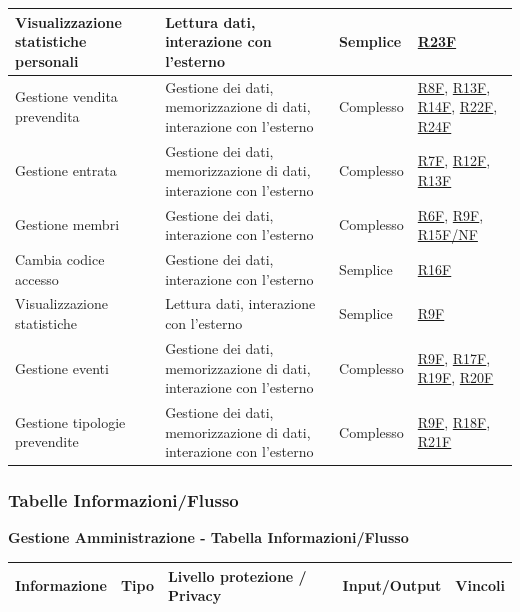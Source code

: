\documentclass[a4paper]{article}
\begin{document}
\begin{center}
\begin{tabularx}{1\textwidth}{|X|X|X|X|}
        \hline
        Visualizzazione statistiche personali & Lettura dati, interazione con l'esterno & Semplice &  \hyperlink{R23F}{R23F} \\
        \hline
        Gestione vendita prevendita & Gestione dei dati, memorizzazione di dati, interazione con l'esterno & Complesso & \hyperlink{R8F}{R8F}, \hyperlink{R13F}{R13F}, \hyperlink{R14F}{R14F}, \hyperlink{R22F}{R22F}, \hyperlink{R24F}{R24F} \\
        \hline
        Gestione entrata & Gestione dei dati, memorizzazione di dati, interazione con l'esterno & Complesso & \hyperlink{R7F}{R7F}, \hyperlink{R12F}{R12F}, \hyperlink{R13F}{R13F} \\
        \hline
        Gestione membri & Gestione dei dati, interazione con l'esterno & Complesso & \hyperlink{R6F}{R6F}, \hyperlink{R9F}{R9F}, \hyperlink{R15F/NF}{R15F/NF} \\
        \hline
        Cambia codice accesso & Gestione dei dati, interazione con l'esterno & Semplice & \hyperlink{R16F}{R16F}  \\
        \hline
        Visualizzazione statistiche & Lettura dati, interazione con l'esterno & Semplice & \hyperlink{R9F}{R9F}  \\
        \hline
        Gestione eventi & Gestione dei dati, memorizzazione di dati, interazione con l'esterno & Complesso & \hyperlink{R9F}{R9F}, \hyperlink{R17F}{R17F}, \hyperlink{R19F}{R19F}, \hyperlink{R20F}{R20F} \\
        \hline
        Gestione tipologie prevendite & Gestione dei dati, memorizzazione di dati, interazione con l'esterno & Complesso & \hyperlink{R9F}{R9F}, \hyperlink{R18F}{R18F}, \hyperlink{R21F}{R21F} \\
        \hline
    \end{tabularx}
\end{center}

\newpage

\subsubsection{Tabelle Informazioni/Flusso}

\textbf{Gestione Amministrazione - Tabella Informazioni/Flusso}

\begin{center}
    \begin{tabularx}{1\textwidth}{|X|X|X|X|X|}
        \hline
        \textbf{Informazione} &\textbf{Tipo} & \textbf{Livello protezione / Privacy} & \textbf{Input/Output} & \textbf{Vincoli}\\
        \hline
        \hline
    \end{tabularx}
\end{center}
\end{document}
